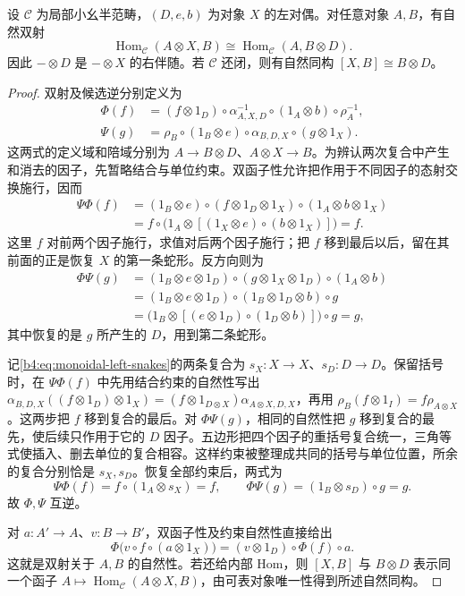 \begin{proposition}\label{b4:prop:monoidal-dual-adjunction}
	设 \(\mathcal C\) 为局部小幺半范畴，\((D,e,b)\) 为对象 \(X\) 的左对偶。对任意对象 \(A,B\)，有自然双射
	\begin{equation}\label{b4:eq:monoidal-dual-adjunction}
		\operatorname{Hom}_{\mathcal C}(A\otimes X,B) \cong\operatorname{Hom}_{\mathcal C}(A,B\otimes D).
	\end{equation}
	因此 \(-\otimes D\) 是 \(-\otimes X\) 的右伴随。若 \(\mathcal C\) 还闭，则有自然同构 \([X,B]\cong B\otimes D\)。
\end{proposition}
\begin{proof}
	双射及候选逆分别定义为
	\[
		\begin{aligned}
			\Phi(f)&=(f\otimes1_D)\circ\alpha_{A,X,D}^{-1} \circ(1_A\otimes b)\circ\rho_A^{-1},\\
			\Psi(g)&=\rho_B\circ(1_B\otimes e)\circ\alpha_{B,D,X} \circ(g\otimes1_X).
		\end{aligned}
	\]
	这两式的定义域和陪域分别为 \(A\to B\otimes D\)、\(A\otimes X\to B\)。为辨认两次复合中产生和消去的因子，先暂略结合与单位约束。双函子性允许把作用于不同因子的态射交换施行，因而
	\[
		\begin{aligned}
			\Psi\Phi(f) &=(1_B\otimes e)\circ(f\otimes1_D\otimes1_X) \circ(1_A\otimes b\otimes1_X)\\
			&=f\circ\bigl(1_A\otimes [(1_X\otimes e)\circ(b\otimes1_X)]\bigr)=f.
		\end{aligned}
	\]
	这里 \(f\) 对前两个因子施行，求值对后两个因子施行；把 \(f\) 移到最后以后，留在其前面的正是恢复 \(X\) 的第一条蛇形。反方向则为
	\[
		\begin{aligned}
			\Phi\Psi(g) &=(1_B\otimes e\otimes1_D)\circ(g\otimes1_X\otimes1_D) \circ(1_A\otimes b)\\
			&=(1_B\otimes e\otimes1_D)\circ(1_B\otimes1_D\otimes b) \circ g\\
			&=\bigl(1_B\otimes [(e\otimes1_D)\circ(1_D\otimes b)]\bigr)\circ g=g,
		\end{aligned}
	\]
	其中恢复的是 \(g\) 所产生的 \(D\)，用到第二条蛇形。

	记\eqref{b4:eq:monoidal-left-snakes}的两条复合为 \(s_X:X\to X\)、\(s_D:D\to D\)。保留括号时，在 \(\Psi\Phi(f)\) 中先用结合约束的自然性写出 \(\alpha_{B,D,X}((f\otimes1_D)\otimes1_X)=(f\otimes1_{D\otimes X})\alpha_{A\otimes X,D,X}\)，再用 \(\rho_B(f\otimes1_I)=f\rho_{A\otimes X}\)。这两步把 \(f\) 移到复合的最后。对 \(\Phi\Psi(g)\)，相同的自然性把 \(g\) 移到复合的最先，使后续只作用于它的 \(D\) 因子。五边形把四个因子的重括号复合统一，三角等式使插入、删去单位的复合相容。这样约束被整理成共同的括号与单位位置，所余的复合分别恰是 \(s_X,s_D\)。恢复全部约束后，两式为
	\[
		\Psi\Phi(f)=f\circ(1_A\otimes s_X)=f, \qquad \Phi\Psi(g)=(1_B\otimes s_D)\circ g=g.
	\]
	故 \(\Phi,\Psi\) 互逆。

	对 \(a:A'\to A\)、\(v:B\to B'\)，双函子性及约束自然性直接给出
	\[
		\Phi\bigl(v\circ f\circ(a\otimes1_X)\bigr) =(v\otimes1_D)\circ\Phi(f)\circ a.
	\]
	这就是双射关于 \(A,B\) 的自然性。若还给内部 Hom，则 \([X,B]\) 与 \(B\otimes D\) 表示同一个函子 \(A\mapsto\operatorname{Hom}_{\mathcal C}(A\otimes X,B)\)，由可表对象唯一性得到所述自然同构。
\end{proof}

